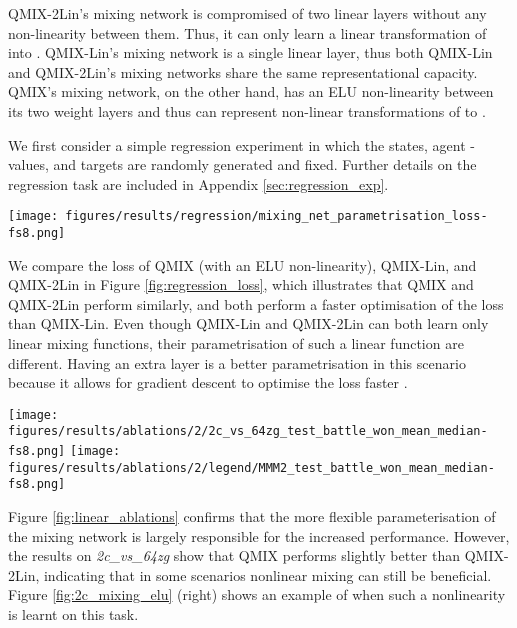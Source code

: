 \documentclass[twoside,11pt]{article}
\begin{document}
QMIX-2Lin's mixing network is compromised of two linear layers without any non-linearity between them. Thus, it can only learn a linear transformation of  into . 
QMIX-Lin's mixing network is a single linear layer, thus both QMIX-Lin and QMIX-2Lin's mixing networks share the same representational capacity.
QMIX's mixing network, on the other hand, has an ELU non-linearity between its 
two weight layers and thus can represent non-linear transformations of  to 
. 

We first consider a simple regression experiment in which the states, agent -values, and targets are randomly generated and fixed. 
Further details on the regression task are included in Appendix \ref{sec:regression_exp}.

\begin{figure*}[h!]
    \centering
    \texttt{[image: figures/results/regression/mixing\_net\_parametrisation\_loss-fs8.png]}
    \caption{The loss on a regression task.}
    \label{fig:regression_loss}
\end{figure*}

We compare the loss of QMIX (with an ELU non-linearity), QMIX-Lin, and QMIX-2Lin in Figure \ref{fig:regression_loss}, which illustrates that QMIX and QMIX-2Lin perform similarly, and both perform a faster optimisation of the loss than QMIX-Lin.
Even though QMIX-Lin and QMIX-2Lin can both learn only linear mixing functions, their parametrisation of such a linear function are different.
Having an extra layer is a better parametrisation in this scenario because it allows for gradient descent to optimise the loss faster \citep{arora2018convergence}.

\begin{figure*}[h!]
    \centering
    \texttt{[image: figures/results/ablations/2/2c\_vs\_64zg\_test\_battle\_won\_mean\_median-fs8.png]}
    \texttt{[image: figures/results/ablations/2/legend/MMM2\_test\_battle\_won\_mean\_median-fs8.png]}
    \caption{Ablations for linear experiments.}
    \label{fig:linear_ablations}
\end{figure*}

Figure \ref{fig:linear_ablations} confirms that the more flexible 
parameterisation of the mixing network is largely responsible for the increased 
performance. 
However, the results on \textit{2c\_vs\_64zg} show that QMIX performs slightly 
better than QMIX-2Lin, indicating that in some scenarios nonlinear mixing can 
still be beneficial. 
Figure \ref{fig:2c_mixing_elu} (right) shows an example of when such a nonlinearity is learnt on this task.
\end{document}
